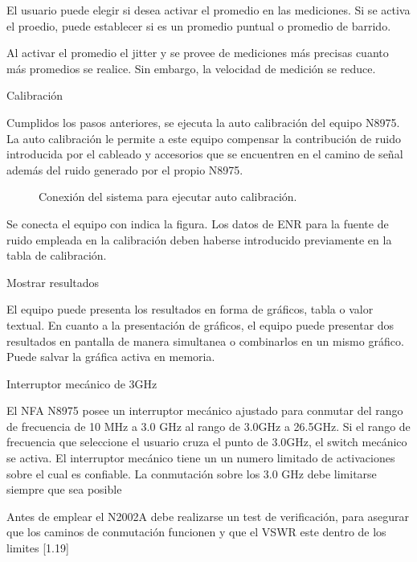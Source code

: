 	El usuario puede elegir si desea activar el promedio en las mediciones. Si se activa el proedio, puede establecer si es
	un promedio puntual o promedio de barrido.
	
	Al activar el promedio el jitter y se provee de mediciones más precisas cuanto más promedios se realice. Sin embargo, la
	velocidad de medición se reduce.
	
	Calibración
	
	Cumplidos los pasos anteriores, se ejecuta la auto calibración del equipo N8975. La auto calibración le permite a este
	equipo compensar la contribución de ruido introducida por el cableado y accesorios que se encuentren en el camino de
	señal además del ruido generado por el propio N8975.		
	
	\begin{figure}
		\centering
		\begin{minipage}{8.063cm}
			\caption{Conexión del sistema para ejecutar auto calibración.}
		\end{minipage}
	\end{figure}
	Se conecta el equipo con indica la figura. Los datos de ENR para la fuente de ruido empleada en la calibración deben haberse introducido previamente en la tabla de calibración.
			
	Mostrar resultados
	
	El equipo puede presenta los resultados en forma de gráficos, tabla o valor textual. En cuanto a la presentación de	gráficos, el equipo puede presentar dos resultados en pantalla de manera simultanea o combinarlos en un mismo gráfico. Puede salvar la gráfica activa en memoria.
	
	Interruptor mecánico de 3GHz
	
	El NFA N8975 posee un interruptor mecánico ajustado para conmutar del rango de frecuencia de 10 MHz a 3.0 GHz al rango	de 3.0GHz a 26.5GHz. Si el rango de frecuencia que seleccione el usuario cruza el punto de 3.0GHz, el switch mecánico se activa. El interruptor mecánico tiene un un numero limitado de activaciones sobre el cual es confiable. La	conmutación sobre los 3.0 GHz debe limitarse siempre que sea posible
	
	Antes de emplear el N2002A debe realizarse un test de verificación, para asegurar que los caminos de conmutación	funcionen y que el VSWR este dentro de los limites [1.19]	
